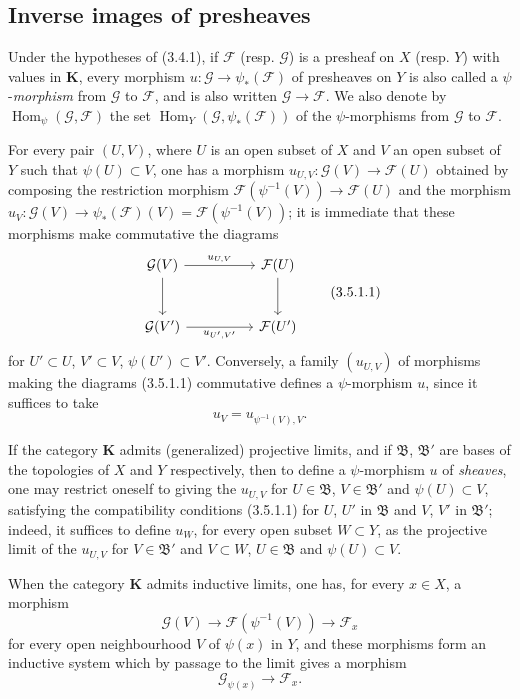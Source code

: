 \subsection{Inverse images of presheaves}

\begin{env}[3.5.1]
\label{0.3.5.1}
Under the hypotheses of (3.4.1), if $\mathcal{F}$ (resp. $\mathcal{G}$) is a
presheaf on $X$ (resp. $Y$) with values in $\mathbf{K}$, every morphism
$u:\mathcal{G}\to\psi_*(\mathcal{F})$ of presheaves on $Y$ is also called
a $\psi$-\emph{morphism} from $\mathcal{G}$ to $\mathcal{F}$, and is
also written $\mathcal{G}\to\mathcal{F}$. We also denote by
$\operatorname{Hom}_\psi(\mathcal{G},\mathcal{F})$ the set
$\operatorname{Hom}_Y(\mathcal{G},\psi_*(\mathcal{F}))$ of the
$\psi$-morphisms from $\mathcal{G}$ to $\mathcal{F}$.

For every pair $(U,V)$, where $U$ is an open subset of $X$ and $V$ an open subset of $Y$
such that $\psi(U)\subset V$, one has a morphism
$u_{U,V}:\mathcal{G}(V)\to\mathcal{F}(U)$ obtained by composing the restriction
morphism
$\mathcal{F}(\psi^{-1}(V))\to\mathcal{F}(U)$ and the morphism
$u_V:\mathcal{G}(V)\to\psi_*(\mathcal{F})(V)=\mathcal{F}(\psi^{-1}(V))$; it
is immediate that these morphisms make commutative the diagrams
\begin{equation*}
\begin{tikzcd}[column sep=huge,row sep=large]
\mathcal{G}(V) \arrow[r,"u_{U,V}"] \arrow[d]
  & \mathcal{F}(U) \arrow[d] \\
\mathcal{G}(V') \arrow[r,"u_{U',V'}"']
  & \mathcal{F}(U')
\end{tikzcd}
\tag{3.5.1.1}\label{0.3.5.1.1}
\end{equation*}
for $U'\subset U$, $V'\subset V$, $\psi(U')\subset V'$. Conversely, a
family $(u_{U,V})$ of morphisms making the
diagrams (3.5.1.1) commutative defines a $\psi$-morphism $u$, since it suffices to take
\[
  u_V=u_{\psi^{-1}(V),V}.
\]


If the category $\mathbf{K}$ admits (generalized) projective limits, and
if $\mathfrak{B}$, $\mathfrak{B}'$ are bases of the topologies of $X$ and
$Y$ respectively, then to define a $\psi$-morphism $u$ of \emph{sheaves},
one may restrict oneself to giving the $u_{U,V}$ for
$U\in\mathfrak{B}$, $V\in\mathfrak{B}'$ and $\psi(U)\subset V$, satisfying the
compatibility conditions (3.5.1.1) for $U$, $U'$ in $\mathfrak{B}$ and
$V$, $V'$ in $\mathfrak{B}'$; indeed, it suffices to define $u_W$, for
every open subset $W\subset Y$, as the projective limit of the $u_{U,V}$ for
$V\in\mathfrak{B}'$ and $V\subset W$, $U\in\mathfrak{B}$ and
$\psi(U)\subset V$.

When the category $\mathbf{K}$ admits inductive limits, one has, for
every $x\in X$, a morphism
\[
  \mathcal{G}(V)\to\mathcal{F}(\psi^{-1}(V))\to\mathcal{F}_x
\]
for every open neighbourhood $V$ of $\psi(x)$ in $Y$, and these morphisms
form an inductive system which by passage to the limit gives a morphism
\[
  \mathcal{G}_{\psi(x)}\to\mathcal{F}_x.
\]
\end{env}

